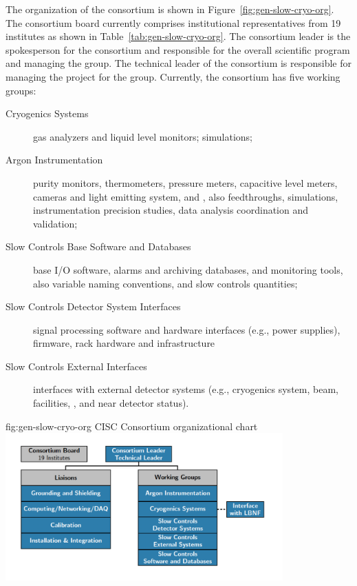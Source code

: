 The organization of the  consortium is shown in
 Figure~\ref{fig:gen-slow-cryo-org}. The  consortium board currently comprises institutional representatives from 19 institutes as shown in Table~\ref{tab:gen-slow-cryo-org}. The consortium leader is the spokesperson for the consortium and responsible for the overall scientific program and managing the group. The technical leader of the consortium is responsible for managing the project for the group. Currently, the
consortium has five working groups:
\begin{description}
 \item[Cryogenics Systems] gas analyzers and liquid level
  monitors;  simulations;
  
 \item[Argon Instrumentation] purity monitors, thermometers, pressure meters, capacitive level meters, cameras and light emitting system, and , also feedthroughs, \efield simulations, instrumentation precision studies,  data analysis coordination and validation; 
 
 \item [Slow Controls Base Software and Databases]  base I/O software, alarms and archiving databases, and monitoring tools, also 
   variable naming conventions, and slow controls quantities;
 \item [Slow Controls Detector System Interfaces] signal processing software and hardware interfaces (e.g., power supplies), firmware, rack hardware and infrastructure   
 \item [Slow Controls External Interfaces] interfaces with external detector systems (e.g., cryogenics system, beam, facilities, , and near detector status).
\end{description}

\begin{dunefigure}{fig:gen-slow-cryo-org}
{CISC Consortium organizational chart}
\includegraphics[width=0.8\textwidth]{graphics/cisc_org_20190716_zoomedin.png}
\end{dunefigure}

